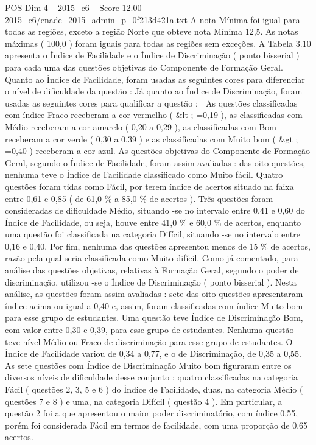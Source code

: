 \begin{textsample}{POS Dim 4 – 2015\_c6 – Score 12.00 – 2015\_c6/enade\_2015\_admin\_p\_0f213d421a.txt}
A nota Mínima foi igual para todas as regiões, exceto a região Norte que obteve nota Mínima 12,5.
As notas máximas ( 100,0 ) foram iguais para todas as regiões sem exceções.
A Tabela 3.10 apresenta o Índice de Facilidade e o Índice de Discriminação ( ponto bisserial ) para cada uma das questões objetivas do Componente de Formação Geral.
Quanto ao Índice de Facilidade, foram usadas as seguintes cores para diferenciar o nível de dificuldade da questão : Já quanto ao Índice de Discriminação, foram usadas as seguintes cores para qualificar a questão :  As questões classificadas com índice Fraco receberam a cor vermelho ( \&lt ; =0,19 ), as classificadas com Médio receberam a cor amarelo ( 0,20 a 0,29 ), as classificadas com Bom receberam a cor verde ( 0,30 a 0,39 ) e as classificadas com Muito bom ( \&gt ; =0,40 ) receberam a cor azul.
As questões objetivas do Componente de Formação Geral, segundo o Índice de Facilidade, foram assim avaliadas : das oito questões, nenhuma teve o Índice de Facilidade classificado como Muito fácil.
Quatro questões foram tidas como Fácil, por terem índice de acertos situado na faixa entre 0,61 e 0,85 ( de 61,0 \% a 85,0 \% de acertos ).
Três questões foram consideradas de dificuldade Médio, situando -se no intervalo entre 0,41 e 0,60 do Índice de Facilidade, ou seja, houve entre 41,0 \% e 60,0 \% de acertos, enquanto uma questão foi classificada na categoria Difícil, situando -se no intervalo entre 0,16 e 0,40.
Por fim, nenhuma das questões apresentou menos de 15 \% de acertos, razão pela qual seria classificada como Muito difícil.
Como já comentado, para análise das questões objetivas, relativas à Formação Geral, segundo o poder de discriminação, utilizou -se o Índice de Discriminação ( ponto bisserial ).
Nesta análise, as questões foram assim avaliadas : sete das oito questões apresentaram índice acima ou igual a 0,40 e, assim, foram classificadas com índice Muito bom para esse grupo de estudantes.
Uma questão teve Índice de Discriminação Bom, com valor entre 0,30 e 0,39, para esse grupo de estudantes.
Nenhuma questão teve nível Médio ou Fraco de discriminação para esse grupo de estudantes.
O Índice de Facilidade variou de 0,34 a 0,77, e o de Discriminação, de 0,35 a 0,55.
As sete questões com Índice de Discriminação Muito bom figuraram entre os diversos níveis de dificuldade desse conjunto : quatro classificadas na categoria Fácil ( questões 2, 3, 5 e 6 ) do Índice de Facilidade, duas, na categoria Médio ( questões 7 e 8 ) e uma, na categoria Difícil ( questão 4 ).
Em particular, a questão 2 foi a que apresentou o maior poder discriminatório, com índice 0,55, porém foi considerada Fácil em termos de facilidade, com uma proporção de 0,65 acertos.

\end{textsample}
